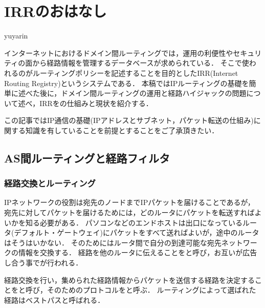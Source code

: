 
\chapter{IRRのおはなし}

\begin{flushright}
 {\headfont yuyarin} %
\end{flushright}

インターネットにおけるドメイン間ルーティングでは，運用の利便性やセキュリティの面から経路情報を管理するデータベースが求められている．
そこで使われるのがルーティングポリシーを記述することを目的としたIRR(Internet Routing Registry)というシステムである．
本稿ではIPルーティングの基礎を簡単に述べた後に，ドメイン間ルーティングの運用と経路ハイジャックの問題について述べ，IRRをの仕組みと現状を紹介する．

この記事ではIP通信の基礎(IPアドレスとサブネット，パケット転送の仕組み)に関する知識を有していることを前提とすることをご了承頂きたい．


\section{AS間ルーティングと経路フィルタ}

\subsection{経路交換とルーティング}

IPネットワークの役割は宛先のノードまでIPパケットを届けることであるが，
宛先に対してパケットを届けるためには，どのルータにパケットを転送すればよいかを知る必要がある．
パソコンなどのエンドホストは出口になっているルータ(デフォルト・ゲートウェイ)にパケットをすべて送ればよいが，途中のルータはそうはいかない．
そのためにはルータ間で自分の到達可能な宛先ネットワークの情報を交換する．
経路を他のルータに伝えることをと呼び，お互いが広告し合う事でが行われる．

経路交換を行い，集められた経路情報からパケットを送信する経路を決定することをと呼び，そのためのプロトコルをと呼ぶ．
ルーティングによって選ばれた経路はベストパスと呼ばれる．

